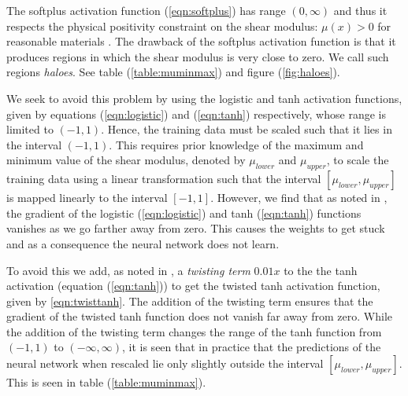 \documentclass[12pt]{article}
\begin{document}
The softplus activation function (\ref{eqn:softplus}) has range $(0,\infty)$ and thus it respects the physical positivity constraint on the shear modulus: $\mu(x)>0$ for reasonable materials \cite{book:segelmathcont}. The drawback of the softplus activation function is that it produces regions in which the shear modulus is very close to zero. We call such regions \textit{haloes}. See table (\ref{table:muminmax}) and figure (\ref{fig:haloes}).

We seek to avoid this problem by using the logistic and tanh activation functions, given by equations (\ref{eqn:logistic}) and (\ref{eqn:tanh}) respectively, whose range is limited to $(-1,1)$. Hence, the training data must be scaled such that it lies in the interval $(-1,1)$. This requires prior knowledge of the maximum and minimum value of the shear modulus, denoted by $\mu_{lower}$ and $\mu_{upper}$, to scale the training data using a linear transformation such that the interval $[\mu_{lower},\mu_{upper}]$ is mapped linearly to the interval $[-1,1]$. However, we find that as noted in \cite{bookchap:lecun98b}, the gradient of the logistic (\ref{eqn:logistic}) and tanh (\ref{eqn:tanh}) functions vanishes as we go farther away from zero. This causes the weights to get stuck and as a consequence the neural network does not learn.

To avoid this we add, as noted in \cite{bookchap:lecun98b}, a \textit{twisting term} $0.01x$ to the the tanh activation (equation (\ref{eqn:tanh})) to get the twisted tanh activation function, given by \ref{eqn:twisttanh}. The addition of the twisting term ensures that the gradient of the twisted tanh function does not vanish far away from zero. While the addition of the twisting term changes the range of the tanh function from $(-1,1)$ to $(-\infty,\infty)$, it is seen that in practice that the predictions of the neural network when rescaled lie only slightly outside the interval $[\mu_{lower},\mu_{upper}]$. This is seen in table (\ref{table:muminmax}).
\end{document}
